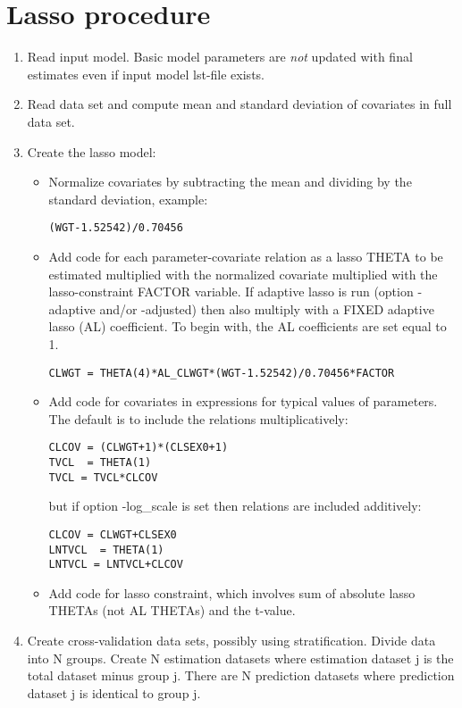 \section{Lasso procedure}
\begin{enumerate}
\item Read input model. Basic model parameters are \emph{not} updated with final estimates even if input model
lst-file exists. 
\item Read data set and compute mean and standard deviation of covariates in full data set.
\item Create the lasso model:
\begin{itemize}
\item Normalize covariates by subtracting the mean and dividing by the standard deviation, example:
\begin{verbatim}
(WGT-1.52542)/0.70456
\end{verbatim}
\item Add code for each parameter-covariate relation as a lasso THETA to be estimated multiplied with
the normalized covariate multiplied with the lasso-constraint FACTOR variable.
If adaptive lasso is run (option -adaptive and/or -adjusted) then also multiply with a FIXED adaptive lasso (AL)
coefficient. To begin with, the AL coefficients are set equal to 1.
\begin{verbatim}
CLWGT = THETA(4)*AL_CLWGT*(WGT-1.52542)/0.70456*FACTOR
\end{verbatim}
\item Add code for covariates in expressions for typical values of parameters. The default is to include
the relations multiplicatively:
\begin{verbatim}
CLCOV = (CLWGT+1)*(CLSEX0+1)
TVCL  = THETA(1)
TVCL = TVCL*CLCOV
\end{verbatim}
but if option -log\_scale is set then relations are included additively:
\begin{verbatim}
CLCOV = CLWGT+CLSEX0
LNTVCL  = THETA(1)
LNTVCL = LNTVCL+CLCOV
\end{verbatim}
\item Add code for lasso constraint, which involves sum of absolute lasso THETAs (not AL THETAs) and
the t-value.
\end{itemize}
\item Create cross-validation data sets, possibly using stratification. Divide data into N groups.
Create N estimation datasets where estimation dataset j is the total dataset minus group j.
There are N prediction datasets where prediction dataset j is identical to group j. 

\end{enumerate}
